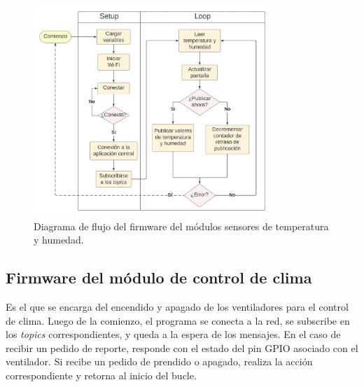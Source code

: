 \begin{figure}[!h]
	\centering
	\includegraphics[width=0.8\textwidth]{./Figures/chapter3/FirmwareTempSensor.jpg}
	\caption[Diagrama de flujo del firmware del módulos sensores de temperatura y humedad]{Diagrama de flujo del firmware del módulos sensores de temperatura y humedad.}
	\label{fig:flow_tempsensor}
\end{figure}

\pagebreak
\subsection{Firmware del módulo de control de clima}
\label{Firmware del módulo de control de clima}

Es el que se encarga del encendido y apagado de los ventiladores para el control de clima.
Luego de la comienzo, el programa se conecta a la red, se subscribe en los \textit{topics} correspondientes, y queda a la espera de los mensajes. En el caso de recibir un pedido de reporte, responde con el estado del pin GPIO asociado con el ventilador. Si recibe un pedido de prendido o apagado, realiza la acción correspondiente y retorna al inicio del bucle.


